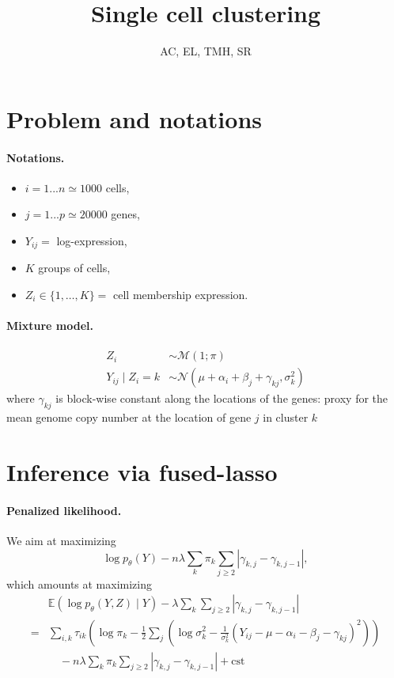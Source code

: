 \documentclass[a4paper, 11pt]{article}
\title{Single cell clustering}
\author{AC, EL, TMH, SR}
\newcommand{\cst}{\text{cst}}
\newcommand{\Esp}{\mathbb{E}}
\newcommand{\Mcal}{\mathcal{M}}
\newcommand{\Ncal}{\mathcal{N}}
\begin{document}
\maketitle

\section{Problem and notations}

\paragraph{Notations.}
\begin{itemize}
 \item $i = 1 ... n \simeq 1000$ cells, 
 \item $j = 1 ... p \simeq 20000$ genes, 
 \item $Y_{ij} =$ log-expression,
 \item $K$ groups of cells,
 \item $Z_i \in \{1, \dots, K\} =$ cell membership expression.
\end{itemize}

\paragraph{Mixture model.}
\begin{align*}
 Z_i & \sim \Mcal(1; \pi) \\
 Y_{ij} \mid Z_i = k & \sim \Ncal(\mu + \alpha_i + \beta_j + \gamma_{kj}, \sigma_k^2)
\end{align*}
where $\gamma_{kj}$ is block-wise constant along the locations of the genes: proxy for the mean genome copy number at the location of gene $j$ in cluster $k$

\section{Inference via fused-lasso}

\paragraph{Penalized likelihood.}
We aim at maximizing
$$
\log p_\theta(Y) - n \lambda \sum_k \pi_k \sum_{j\geq 2} |\gamma_{k,j} - \gamma_{k, j-1}|,
$$
which amounts at maximizing
\begin{align*}
 & \Esp \left(\log p_\theta(Y, Z)  \mid Y\right)- \lambda \sum_k \sum_{j\geq 2} |\gamma_{k,j} - \gamma_{k, j-1}| \\
 = & \sum_{i, k} \tau_{ik} \left(\log \pi_k - \frac12 \sum_j \left( \log\sigma_k^2 - \frac1{\sigma_k^2} (Y_{ij} - \mu - \alpha_i - \beta_j - \gamma_{kj})^2 \right) \right) \\
 & \quad - n \lambda \sum_k \pi_k \sum_{j\geq 2} |\gamma_{k,j} - \gamma_{k, j-1}| + \cst
\end{align*}
\end{document}
